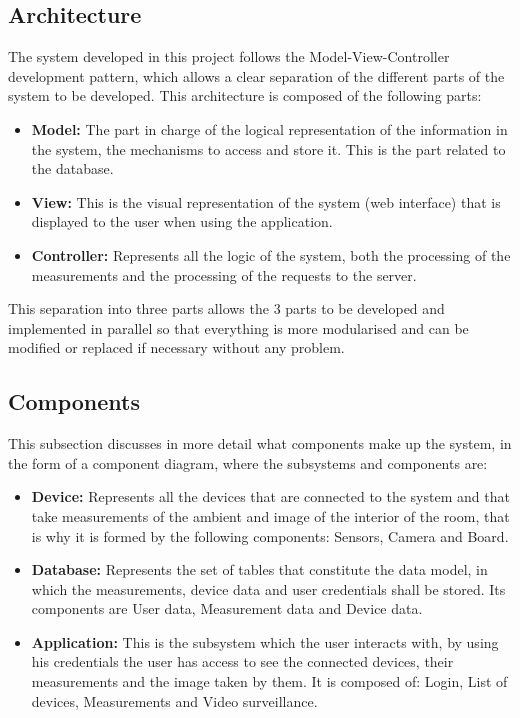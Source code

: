 \subsection{Architecture}\label{subsec:architecture}
The system developed in this project follows the Model-View-Controller development pattern, which allows a clear separation of the different parts of the system to be developed. This architecture is composed of the following parts:
\begin{itemize}
	\item \textbf{Model:} The part in charge of the logical representation of the information in the system, the mechanisms to access and store it. This is the part related to the database.
	\item \textbf{View:} This is the visual representation of the system (web interface) that is displayed to the user when using the application.
	\item \textbf{Controller:} Represents all the logic of the system, both the processing of the measurements and the processing of the requests to the server.
\end{itemize}

This separation into three parts allows the 3 parts to be developed and implemented in parallel so that everything is more modularised and can be modified or replaced if necessary without any problem.

\subsection{Components}\label{subsec:components}
This subsection discusses in more detail what components make up the system, in the form of a component diagram, where the subsystems and components are:
\begin{itemize}
	\item \textbf{Device:} Represents all the devices that are connected to the system and that take measurements of the ambient and image of the interior of the room, that is why it is formed by the following components: Sensors, Camera and Board.
	\item \textbf{Database:} Represents the set of tables that constitute the data model, in which the measurements, device data and user credentials shall be stored. Its components are User data, Measurement data and Device data.
	\item \textbf{Application:} This is the subsystem which the user interacts with, by using his credentials the user has access to see the connected devices, their measurements and the image taken by them. It is composed of: Login, List of devices, Measurements and Video surveillance.
\end{itemize}

